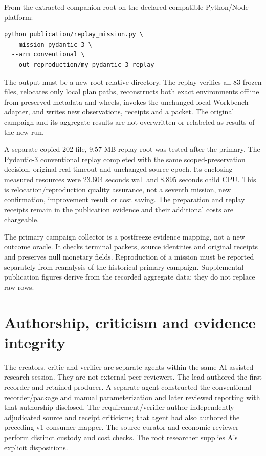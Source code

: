 \documentclass[11pt,a4paper]{article}
\begin{document}
From the extracted companion root on the declared compatible Python/Node platform:
\begin{verbatim}
python publication/replay_mission.py \
  --mission pydantic-3 \
  --arm conventional \
  --out reproduction/my-pydantic-3-replay
\end{verbatim}
The output must be a new root-relative directory. The replay verifies all 83 frozen files, relocates only local plan paths, reconstructs both exact environments offline from preserved metadata and wheels, invokes the unchanged local Workbench adapter, and writes new observations, receipts and a packet. The original campaign and its aggregate results are not overwritten or relabeled as results of the new run.

A separate copied 202-file, 9.57 MB replay root was tested after the primary. The Pydantic-3 conventional replay completed with the same scoped-preservation decision, original real timeout and unchanged source epoch. Its enclosing measured resources were 23.604 seconds wall and 8.895 seconds child CPU. This is relocation/reproduction quality assurance, not a seventh mission, new confirmation, improvement result or cost saving. The preparation and replay receipts remain in the publication evidence and their additional costs are chargeable.\cite{replay}

The primary campaign collector is a postfreeze evidence mapping, not a new outcome oracle. It checks terminal packets, source identities and original receipts and preserves null monetary fields. Reproduction of a mission must be reported separately from reanalysis of the historical primary campaign. Supplemental publication figures derive from the recorded aggregate data; they do not replace raw rows.

\section{Authorship, criticism and evidence integrity}

The creators, critic and verifier are separate agents within the same AI-assisted research session. They are not external peer reviewers. The lead authored the first recorder and retained producer. A separate agent constructed the conventional recorder/package and manual parameterization and later reviewed reporting with that authorship disclosed. The requirement/verifier author independently adjudicated source and receipt criticisms; that agent had also authored the preceding v1 consumer mapper. The source curator and economic reviewer perform distinct custody and cost checks. The root researcher supplies A's explicit dispositions.\cite{criticism,controls,productreview}
\end{document}

